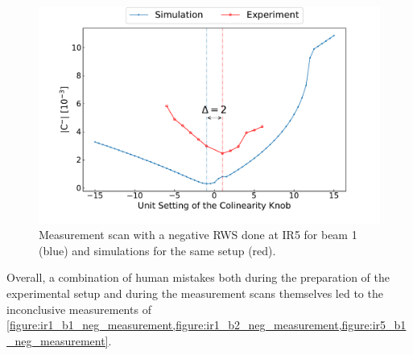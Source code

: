 \begin{figure}[!htb]
    \centering
    \includegraphics*[width=\textwidth]{Figures/Appendices/rws_measurement_ir5_b2_neg.pdf}
    \caption{Measurement scan with a negative RWS done at IR\num{5} for beam \num{1} (\textcolor{mplblue}{blue}) and simulations for the same setup (\textcolor{mplr}{red}).}
    \label{figure:ir5_b2_neg_measurement}
\end{figure}

Overall, a combination of human mistakes both during the preparation of the experimental setup and during the measurement scans themselves led to the inconclusive measurements of \cref{figure:ir1_b1_neg_measurement,figure:ir1_b2_neg_measurement,figure:ir5_b1_neg_measurement}.
